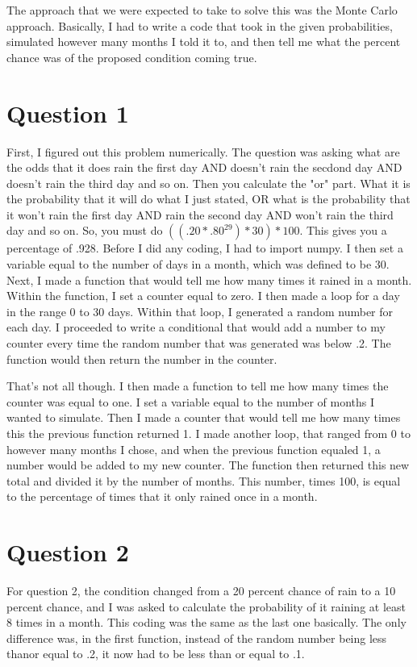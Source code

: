 \documentclass[twocolumn]{revtex4}
\begin{document}
The approach that we were expected to take to solve this was the Monte Carlo approach. Basically, I had to write a code that took in the given probabilities, simulated however many months I told it to, and then tell me what the percent chance was of the proposed condition coming true.
\section{Question 1}
First, I figured out this problem numerically. The question was asking what are the odds that it does rain the first day AND doesn't rain the secdond day AND doesn't rain the third day and so on. Then you calculate the "or" part. What it is the probability that it will do what I just stated, OR what is the probability that it won't rain the first day AND rain the second day AND won't rain the third day and so on. So, you must do $( (.20 * .80^{29}) * 30) * 100$. This gives you a percentage of .928.
Before I did any coding, I had to import numpy. I then set a variable equal to the number of days in a month, which was defined to be 30. Next, I made a function that would tell me how many times it rained in a month.  Within the function, I set a counter equal to zero. I then made a loop for a day in the range 0 to 30 days. Within that loop, I generated a random number for each day. I proceeded to write a conditional that would add a number to my counter every time the random number that was generated was below .2. The function would then return the number in the counter.

That's not all though. I then made a function to tell me how many times the counter was equal to one. I set a variable equal to the number of months I wanted to simulate. Then I made a counter that would tell me how many times this the previous function returned 1. I made another loop, that ranged from 0 to however many months I chose, and when the previous function equaled 1, a number would be added to my new counter. The function then returned this new total and divided it by the number of months. This number, times 100, is equal to the percentage of times that it only rained once in a month.

\section{Question 2}
For question 2, the condition changed from a 20 percent chance of rain to a 10 percent chance, and I was asked to calculate the probability of it raining at least 8 times in a month. This coding was the same as the last one basically. The only difference was, in the first function, instead of the random number being less thanor equal to .2, it now had to be less than or equal to .1.
\end{document}
